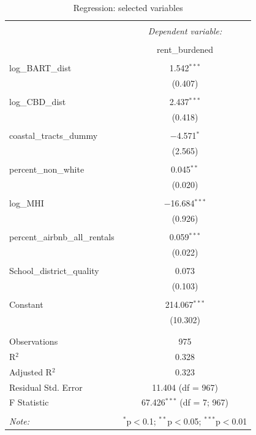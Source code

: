 \documentclass[10pt, letterpaper]{amsart}
\begin{document}
\begin{table}[!htbp] \centering 
  \caption{Regression: selected variables} 
  \label{} 
  \begin{tabular}{@{\extracolsep{5pt}}lc} 
    \\[-1.8ex]\hline 
    \hline \\[-1.8ex] 
    & \multicolumn{1}{c}{\textit{Dependent variable:}} \\ 
    \cline{2-2} 
    \\[-1.8ex] & rent\_burdened \\ 
    \hline \\[-1.8ex] 
    log\_BART\_dist & 1.542$^{***}$ \\ 
    & (0.407) \\ 
    & \\ 
    log\_CBD\_dist & 2.437$^{***}$ \\ 
    & (0.418) \\ 
    & \\ 
    coastal\_tracts\_dummy & $-$4.571$^{*}$ \\ 
    & (2.565) \\ 
    & \\ 
    percent\_non\_white & 0.045$^{**}$ \\ 
    & (0.020) \\ 
    & \\ 
    log\_MHI & $-$16.684$^{***}$ \\ 
    & (0.926) \\ 
    & \\ 
    percent\_airbnb\_all\_rentals & 0.059$^{***}$ \\ 
    & (0.022) \\ 
    & \\ 
    School\_district\_quality & 0.073 \\ 
    & (0.103) \\ 
    & \\ 
    Constant & 214.067$^{***}$ \\ 
    & (10.302) \\ 
    & \\ 
    \hline \\[-1.8ex] 
    Observations & 975 \\ 
    R$^{2}$ & 0.328 \\ 
    Adjusted R$^{2}$ & 0.323 \\ 
    Residual Std. Error & 11.404 (df = 967) \\ 
    F Statistic & 67.426$^{***}$ (df = 7; 967) \\ 
    \hline 
    \hline \\[-1.8ex] 
    \textit{Note:}  & \multicolumn{1}{r}{$^{*}$p$<$0.1; $^{**}$p$<$0.05; $^{***}$p$<$0.01} \\ 
  \end{tabular} 
\end{table}
\end{document}
